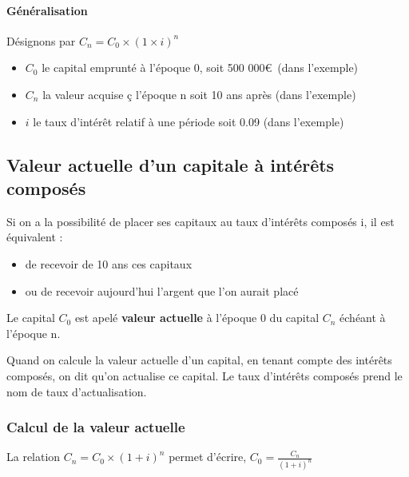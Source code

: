 	\paragraph{Généralisation}
	Désignons par $C_n = C_0 \times (1 \times i)^n$
	\begin{itemize}
		\item $C_0$ le capital emprunté à l'époque 0, soit 500 000\euro ~(dans l'exemple)
		\item $C_n$ la valeur acquise ç l'époque n soit 10 ans après (dans l'exemple)
		\item $i$ le taux d'intérêt relatif à une période soit 0.09 (dans l'exemple)
	\end{itemize}
	\subsection{Valeur actuelle d'un capitale à intérêts composés}
	Si on a la possibilité de placer ses capitaux au taux d'intérêts composés i, il est équivalent :
	\begin{itemize}
		\item de recevoir de 10 ans ces capitaux
		\item ou de recevoir aujourd'hui l'argent que l'on aurait placé
	\end{itemize}
	Le capital $C_0$ est apelé \textbf{valeur actuelle} à l'époque 0 du capital $C_n$ échéant à l'époque n.

	Quand on calcule la valeur actuelle d'un capital, en tenant compte des intérêts composés, on dit qu'on actualise ce capital. Le taux d'intérêts composés prend le nom de taux d'actualisation.
	\subsubsection{Calcul de la valeur actuelle}
	La relation $C_n=C_0 \times (1+i)^n$ permet d'écrire, $C_0=\frac{C_n}{(1+i)^n}$

